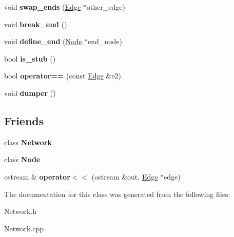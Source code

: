 \begin{DoxyCompactItemize}
\item 
\hypertarget{classEdge_ac6c6b1f954539af5673cbf711b211f19}{}void {\bfseries swap\+\_\+ends} (\hyperlink{classEdge}{Edge} $\ast$other\+\_\+edge)\label{classEdge_ac6c6b1f954539af5673cbf711b211f19}

\item 
\hypertarget{classEdge_a64c4bf1950f8eedd36f6bb5dbfdbc46f}{}void {\bfseries break\+\_\+end} ()\label{classEdge_a64c4bf1950f8eedd36f6bb5dbfdbc46f}

\item 
\hypertarget{classEdge_ad13aa9622d299c757a2a5d743b8a7018}{}void {\bfseries define\+\_\+end} (\hyperlink{classNode}{Node} $\ast$end\+\_\+node)\label{classEdge_ad13aa9622d299c757a2a5d743b8a7018}

\item 
\hypertarget{classEdge_a2c415df14bf24f20ce80738c140305e3}{}bool {\bfseries is\+\_\+stub} ()\label{classEdge_a2c415df14bf24f20ce80738c140305e3}

\item 
\hypertarget{classEdge_a9e86a5ffac43a72ca5f6b547f8a3fd61}{}bool {\bfseries operator==} (const \hyperlink{classEdge}{Edge} \&e2)\label{classEdge_a9e86a5ffac43a72ca5f6b547f8a3fd61}

\item 
\hypertarget{classEdge_a3f8c785f1c9873d7293bb31367b5611e}{}void {\bfseries dumper} ()\label{classEdge_a3f8c785f1c9873d7293bb31367b5611e}

\end{DoxyCompactItemize}
\subsection*{Friends}
\begin{DoxyCompactItemize}
\item 
\hypertarget{classEdge_a88b59289ffd793fecd040d32e397b1e9}{}class {\bfseries Network}\label{classEdge_a88b59289ffd793fecd040d32e397b1e9}

\item 
\hypertarget{classEdge_a6db9d28bd448a131448276ee03de1e6d}{}class {\bfseries Node}\label{classEdge_a6db9d28bd448a131448276ee03de1e6d}

\item 
\hypertarget{classEdge_a5a98f933c06debc7299f4e1086ab243d}{}ostream \& {\bfseries operator$<$$<$} (ostream \&out, \hyperlink{classEdge}{Edge} $\ast$edge)\label{classEdge_a5a98f933c06debc7299f4e1086ab243d}

\end{DoxyCompactItemize}


The documentation for this class was generated from the following files\+:\begin{DoxyCompactItemize}
\item 
Network.\+h\item 
Network.\+cpp\end{DoxyCompactItemize}
